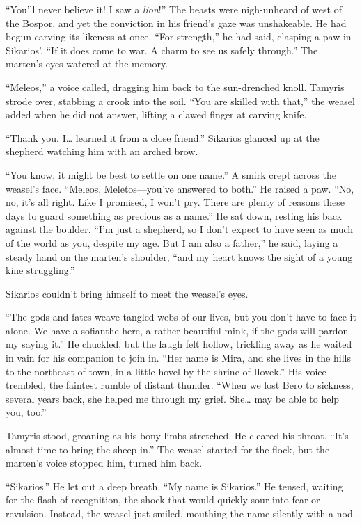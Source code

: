 ``You'll never believe it! I saw a \emph{lion}!'' The beasts were nigh-unheard of west of the Bospor, and yet the conviction in his friend's gaze was unshakeable. He had begun carving its likeness at once. ``For strength,'' he had said, clasping a paw in Sikarios'. ``If it does come to war. A charm to see us safely through.'' The marten's eyes watered at the memory.

``Meleos,'' a voice called, dragging him back to the sun-drenched knoll. Tamyris strode over, stabbing a crook into the soil. ``You are skilled with that,'' the weasel added when he did not answer, lifting a clawed finger at carving knife.

``Thank you. I\ldots{} learned it from a close friend.'' Sikarios glanced up at the shepherd watching him with an arched brow.

``You know, it might be best to settle on one name.'' A smirk crept across the weasel's face. ``Meleos, Meletos---you've answered to both.'' He raised a paw. ``No, no, it's all right. Like I promised, I won't pry. There are plenty of reasons these days to guard something as precious as a name.'' He sat down, resting his back against the boulder. ``I'm just a shepherd, so I don't expect to have seen as much of the world as you, despite my age. But I am also a father,'' he said, laying a steady hand on the marten's shoulder, ``and my heart knows the sight of a young kine struggling.''

Sikarios couldn't bring himself to meet the weasel's eyes.

``The gods and fates weave tangled webs of our lives, but you don't have to face it alone. We have a sofianthe here, a rather beautiful mink, if the gods will pardon my saying it.'' He chuckled, but the laugh felt hollow, trickling away as he waited in vain for his companion to join in. ``Her name is Mira, and she lives in the hills to the northeast of town, in a little hovel by the shrine of Ilovek.'' His voice trembled, the faintest rumble of distant thunder. ``When we lost Bero to sickness, several years back, she helped me through my grief. She\ldots{} may be able to help you, too.''

Tamyris stood, groaning as his bony limbs stretched. He cleared his throat. ``It's almost time to bring the sheep in.'' The weasel started for the flock, but the marten's voice stopped him, turned him back.

``Sikarios.'' He let out a deep breath. ``My name is Sikarios.'' He tensed, waiting for the flash of recognition, the shock that would quickly sour into fear or revulsion. Instead, the weasel just smiled, mouthing the name silently with a nod.

